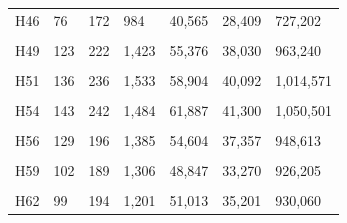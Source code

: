 \documentclass[
  a4paper,
  titlepage]{article}
\begin{document}
\begin{longtable}[t]{lllllll}
H46 & 76 & 172 & 984 & 40,565 & 28,409 & 727,202\\
 
\cellcolor{gray!6}{H47} & \cellcolor{gray!6}{117} & \cellcolor{gray!6}{224} & \cellcolor{gray!6}{1,377} & \cellcolor{gray!6}{56,064} & \cellcolor{gray!6}{38,320} & \cellcolor{gray!6}{932,167}\\
 
H49 & 123 & 222 & 1,423 & 55,376 & 38,030 & 963,240\\
 
\cellcolor{gray!6}{H50} & \cellcolor{gray!6}{130} & \cellcolor{gray!6}{228} & \cellcolor{gray!6}{1,501} & \cellcolor{gray!6}{58,680} & \cellcolor{gray!6}{39,790} & \cellcolor{gray!6}{1,087,536}\\
 
H51 & 136 & 236 & 1,533 & 58,904 & 40,092 & 1,014,571\\
 
\cellcolor{gray!6}{H52} & \cellcolor{gray!6}{138} & \cellcolor{gray!6}{254} & \cellcolor{gray!6}{1,622} & \cellcolor{gray!6}{63,936} & \cellcolor{gray!6}{43,221} & \cellcolor{gray!6}{1,095,092}\\
 
H54 & 143 & 242 & 1,484 & 61,887 & 41,300 & 1,050,501\\
 
\cellcolor{gray!6}{H55} & \cellcolor{gray!6}{138} & \cellcolor{gray!6}{226} & \cellcolor{gray!6}{1,591} & \cellcolor{gray!6}{61,944} & \cellcolor{gray!6}{41,825} & \cellcolor{gray!6}{1,071,762}\\
 
H56 & 129 & 196 & 1,385 & 54,604 & 37,357 & 948,613\\
 
\cellcolor{gray!6}{H58} & \cellcolor{gray!6}{103} & \cellcolor{gray!6}{199} & \cellcolor{gray!6}{1,306} & \cellcolor{gray!6}{50,458} & \cellcolor{gray!6}{34,932} & \cellcolor{gray!6}{888,029}\\
 
H59 & 102 & 189 & 1,306 & 48,847 & 33,270 & 926,205\\
 
\cellcolor{gray!6}{H61} & \cellcolor{gray!6}{122} & \cellcolor{gray!6}{215} & \cellcolor{gray!6}{1,301} & \cellcolor{gray!6}{51,290} & \cellcolor{gray!6}{34,628} & \cellcolor{gray!6}{874,666}\\
 
H62 & 99 & 194 & 1,201 & 51,013 & 35,201 & 930,060\\
 

\end{longtable}
\end{document}
